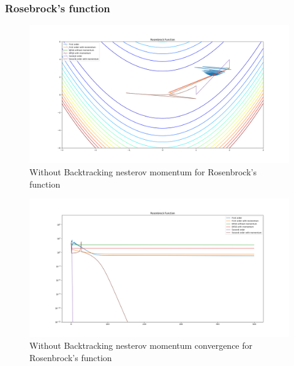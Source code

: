 \documentclass{article}
\begin{document}
\subsubsection{Rosebrock's function}
\begin{figure}[H]
	\includegraphics[width=\linewidth]{../Images/rosenbrocknesterov.png}
	\caption{Without Backtracking nesterov momentum for Rosenbrock's function}
	\label{fig:Without Backtracking nesterov momentum for Rosenbrock's function}
\end{figure}

\begin{figure}[H]
	\includegraphics[width=\linewidth]{../Images/rosenbrocknesterov1.png}
	\caption{Without Backtracking nesterov momentum convergence for Rosenbrock's function}
	\label{fig:Without Backtracking nesterov momentum convergence for Rosenbrock's function}
\end{figure}
\end{document}
